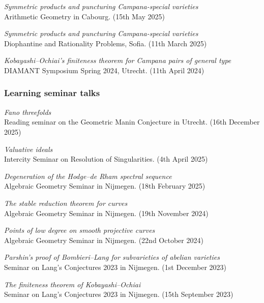 \documentclass[paper=a4,fontsize=10pt,DIV=12,BCOR=3mm,pdftex]{scrartcl}
\begin{document}
\textit{Symmetric products and puncturing Campana-special varieties} \\
Arithmetic Geometry in Cabourg. (15th May 2025) \medskip

\textit{Symmetric products and puncturing Campana-special varieties} \\
Diophantine and Rationality Problems, Sofia. (11th March 2025) \medskip

\textit{Kobayashi--Ochiai's finiteness theorem for Campana pairs of general type} \\
DIAMANT Symposium Spring 2024, Utrecht. (11th April 2024)

\subsubsection*{Learning seminar talks}

\textit{Fano threefolds} \\
Reading seminar on the Geometric Manin Conjecture in Utrecht. (16th December 2025) \medskip

\textit{Valuative ideals} \\
Intercity Seminar on Resolution of Singularities. (4th April 2025) \medskip

\textit{Degeneration of the Hodge--de Rham spectral sequence} \\
Algebraic Geometry Seminar in Nijmegen. (18th February 2025) \medskip

\textit{The stable reduction theorem for curves} \\
Algebraic Geometry Seminar in Nijmegen. (19th November 2024) \medskip

\textit{Points of low degree on smooth projective curves} \\
Algebraic Geometry Seminar in Nijmegen. (22nd October 2024) \medskip

\textit{Parshin's proof of Bombieri--Lang for subvarieties of abelian varieties} \\
Seminar on Lang's Conjectures 2023 in Nijmegen. (1st December 2023) \medskip

\textit{The finiteness theorem of Kobayashi--Ochiai} \\
Seminar on Lang's Conjectures 2023 in Nijmegen. (15th September 2023)
\end{document}
